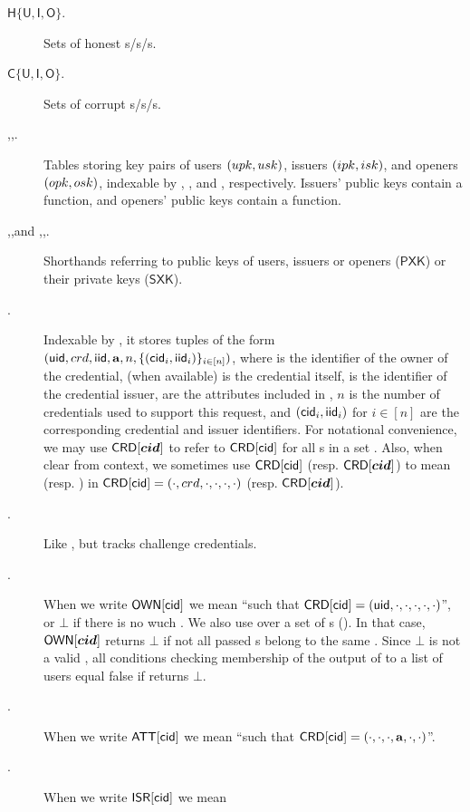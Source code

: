 \begin{description}
\item[$\mathsf{H}\lbrace\mathsf{U},\mathsf{I},\mathsf{O} \rbrace$.] Sets of
  honest {\uid}s/{\iid}s/{\oid}s.
\item[$\mathsf{C}\lbrace\mathsf{U},\mathsf{I},\mathsf{O} \rbrace$.] Sets of
  corrupt {\uid}s/{\iid}s/{\oid}s.
\item[\UK,\IK,\OK.] Tables storing key pairs of users $(upk,usk)$, issuers
  $(ipk,isk)$, and openers $(opk,osk)$, indexable by \uid, \iid, and \oid,
  respectively. Issuers' public keys contain a \fissue function, and
  openers' public keys contain a \finsp function.
\item[\PUBUK,\PUBIK,\PUBOK and \PRVUK,\PRVIK,\PRVOK.] Shorthands referring to
  public keys of users, issuers or openers ($\mathsf{PXK}$) or their private
  keys ($\mathsf{SXK}$).
\item[\CRED.] Indexable by \cid, it stores
  tuples of the form $(\mathsf{uid},crd,\mathsf{iid},\mathbf{a},n,\lbrace (\mathsf{cid}_i,\mathsf{iid}_i)
  \rbrace_{i \in [n]})$, where \uid is the identifier of the owner of the
  credential, \cred (when available) is the credential itself, \iid is the
  identifier of the credential issuer, \attrs are the attributes included in
  \cred, $n$ is the number of credentials used to support this request, and
  $(\mathsf{cid}_i,\mathsf{iid}_i)$ for $i \in [n]$ are the corresponding credential and issuer
  identifiers. For notational convenience, we may use $\mathsf{CRD}[\boldsymbol{cid}]$
  to refer to $\mathsf{CRD}[\mathsf{cid}]$ for all {\cid}s in a set \scid. Also, when clear
  from context, we sometimes use $\mathsf{CRD}[\mathsf{cid}]$ (resp. $\mathsf{CRD}[\boldsymbol{cid}]$) to
  mean \cred (resp. \scred) in $\mathsf{CRD}[\mathsf{cid}] = (\cdot,crd,\cdot,\cdot,
  \cdot,\cdot)$ (resp. $\mathsf{CRD}[\boldsymbol{cid}]$).
\item[\CCRED.] Like \CRED, but tracks challenge credentials.
\item[\OWNR.] When we write $\mathsf{OWN}[\mathsf{cid}]$ we mean
  ``\uid such that $\mathsf{CRD}[\mathsf{cid}] = (\mathsf{uid},\cdot,\cdot,\cdot,\cdot,\cdot)$'', or
  $\bot$ if there is no wuch \uid. We also use \OWNR over a set of {\cid}s
  (\scid). In that case, $\mathsf{OWN}[\boldsymbol{cid}]$ returns $\bot$ if
  not all passed {\cid}s belong to the same \uid. Since $\bot$ is not a valid
  \uid, all conditions checking membership of the output of \OWNR to a list of
  users equal false if \OWNR returns $\bot$.
\item[\ATTR.] When we write $\mathsf{ATT}[\mathsf{cid}]$ we mean
  ``\attrs such that $\mathsf{CRD}[\mathsf{cid}] = (\cdot,\cdot,\cdot,\mathbf{a},\cdot,\cdot)$''.
\item[\ISR.] When we write $\mathsf{ISR}[\mathsf{cid}]$ we mean

\end{description}
